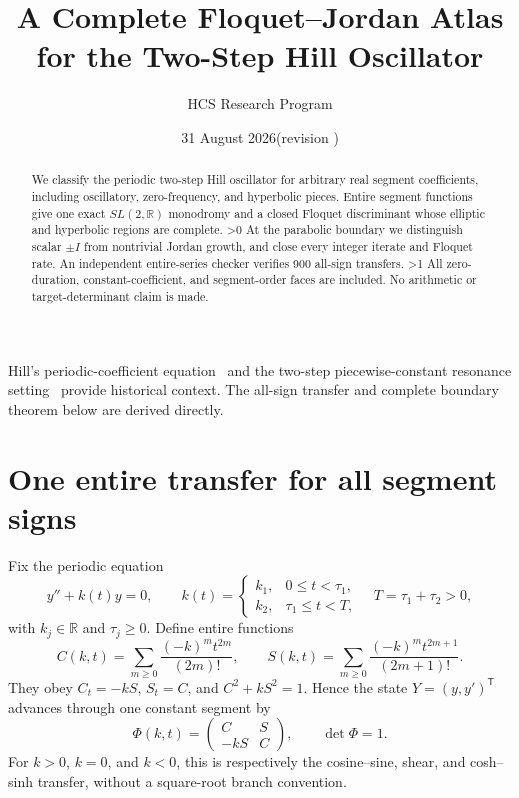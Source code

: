 \documentclass[10pt]{article}
\title{A Complete Floquet--Jordan Atlas\\for the Two-Step Hill Oscillator}
\author{HCS Research Program}
\date{31 August 2026\quad (revision \CRevisionRound)}
\newcommand{\R}{\mathbb R}
\begin{document}
\maketitle
\begin{abstract}
We classify the periodic two-step Hill oscillator for arbitrary real segment
coefficients, including oscillatory, zero-frequency, and hyperbolic pieces.
Entire segment functions give one exact $SL(2,\R)$ monodromy and a closed
Floquet discriminant whose elliptic and hyperbolic regions are complete.
\ifnum\CRevisionRound>0
At the parabolic boundary we distinguish scalar $\pm I$ from nontrivial
Jordan growth, and close every integer iterate and Floquet rate.  An
independent entire-series checker verifies 900 all-sign transfers.
\fi
\ifnum\CRevisionRound>1
All zero-duration, constant-coefficient, and segment-order faces are included.
No arithmetic or target-determinant claim is made.
\fi
\end{abstract}

Hill's periodic-coefficient equation~\cite{Hill1886} and the two-step
piecewise-constant resonance setting~\cite{Golubev1997} provide historical
context.  The all-sign transfer and complete boundary theorem below are
derived directly.

\section{One entire transfer for all segment signs}
Fix the periodic equation
\begin{equation}
 y''+k(t)y=0,\qquad
 k(t)=\begin{cases}k_1,&0\le t<\tau_1,\\
 k_2,&\tau_1\le t<T,\end{cases}
 \quad T=\tau_1+\tau_2>0,                 \label{eq:hill}
\end{equation}
with $k_j\in\R$ and $\tau_j\ge0$.  Define entire functions
\begin{equation}
 C(k,t)=\sum_{m\ge0}\frac{(-k)^mt^{2m}}{(2m)!},\qquad
 S(k,t)=\sum_{m\ge0}\frac{(-k)^mt^{2m+1}}{(2m+1)!}.      \label{eq:CS}
\end{equation}
They obey $C_t=-kS$, $S_t=C$, and $C^2+kS^2=1$.  Hence the state
$Y=(y,y')^{\mathsf T}$ advances through one constant segment by
\begin{equation}
 \Phi(k,t)=\begin{pmatrix}C&S\\-kS&C\end{pmatrix},
 \qquad \det\Phi=1.                                      \label{eq:phi}
\end{equation}
For $k>0$, $k=0$, and $k<0$, this is respectively the cosine--sine,
shear, and cosh--sinh transfer, without a square-root branch convention.
\end{document}
